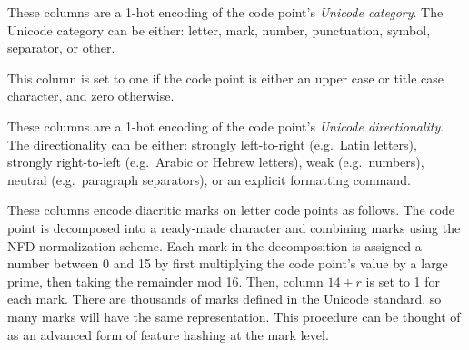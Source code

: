 \documentclass[sigconf,10pt]{acmart}
\newcommand{\str}[1]{\texttt{#1}}
\newcommand{\defn}[1]{\textit{#1}}
\begin{document}
\begin{description}
\begin{description}[font=\normalfont\itshape]
\item[Columns 1-7:]
    These columns are a 1-hot encoding of the code point's \defn{Unicode category}.
    The Unicode category can be either:
%
letter,
mark,
number,
punctuation,
symbol,
separator,
or other.

\item[Column 8:]
This column is set to one if the code point is either an upper case or title case character,
and zero otherwise.

\item[Columns 9-13:]
    These columns are a 1-hot encoding of the code point's \defn{Unicode directionality}.
    The directionality can be either:
strongly left-to-right (e.g.\ Latin letters),
strongly right-to-left (e.g.\ Arabic or Hebrew letters),
weak (e.g.\ numbers),
neutral (e.g.\ paragraph separators),
or an explicit formatting command.

\item[Columns 14-29:]
These columns encode diacritic marks on letter code points as follows.
The code point is decomposed into a ready-made character and combining marks using the NFD normalization scheme.
Each mark in the decomposition is assigned a number between 0 and 15 by first multiplying the code point's value by a large prime, 
then taking the remainder mod 16.
Then, column $14+r$ is set to 1 for each mark.
There are thousands of marks defined in the Unicode standard,
so many marks will have the same representation.
This procedure can be thought of as an advanced form of feature hashing \citep{weinberger2009feature} at the mark level.


\end{description}
\end{description}
\end{document}
